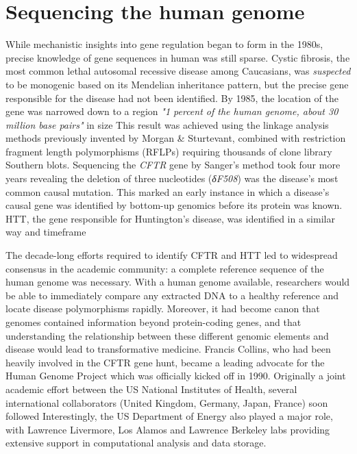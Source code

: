 \section{Sequencing the human genome}
While mechanistic insights into gene regulation began to form in the 1980s, precise knowledge of gene sequences in human was still sparse. Cystic fibrosis, the most common lethal autosomal recessive disease among Caucasians, was \textit{suspected} to be monogenic based on its Mendelian inheritance pattern, but the precise gene responsible for the disease had not been identified. By 1985, the location of the gene was narrowed down to a region \textit{"1 percent of the human genome, about 30 million base pairs"} in size This result was achieved using the linkage analysis methods previously invented by Morgan \& Sturtevant, combined with restriction fragment length polymorphisms (RFLPs) requiring thousands of clone library Southern blots. Sequencing the \textit{CFTR} gene by Sanger's method took four more years revealing the deletion of three nucleotides (\textit{{{\greekfont δ}}F508}) was the disease's most common causal mutation. This marked an early instance in which a disease's causal gene was identified by bottom-up genomics before its protein was known. HTT, the gene responsible for Huntington's disease, was identified in a similar way and timeframe

The decade-long efforts required to identify CFTR and HTT led to widespread consensus in the academic community: a complete reference sequence of the human genome was necessary. With a human genome available, researchers would be able to immediately compare any extracted DNA to a healthy reference and locate disease polymorphisms rapidly. Moreover, it had become canon that genomes contained information beyond protein-coding genes, and that understanding the relationship between these different genomic elements and disease would lead to transformative medicine. Francis Collins, who had been heavily involved in the CFTR gene hunt, became a leading advocate for the Human Genome Project which was officially kicked off in 1990. Originally a joint academic effort between the US National Institutes of Health, several international collaborators (United Kingdom, Germany, Japan, France) soon followed Interestingly, the US Department of Energy also played a major role, with Lawrence Livermore, Los Alamos and Lawrence Berkeley labs providing extensive support in computational analysis and data storage.


